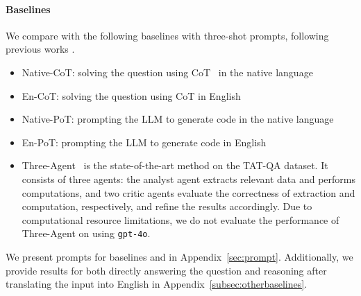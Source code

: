 \paragraph{Baselines}
We compare \ourmethod with the following baselines with three-shot prompts, following previous works \cite{shi2023MGSM,li-etal-2024-eliciting-Multilingual-code}.
\begin{itemize}
    \item Native-CoT: solving the question using CoT~\cite{wei2022chain-of-thought} in the native language
    \item En-CoT: solving the question using CoT in English
    \item Native-PoT: prompting the LLM to generate code in the native language \cite{pal,pot}
    \item En-PoT: prompting the LLM to generate code in English 
    \item Three-Agent~\cite{fatemi2024three-agent} is the state-of-the-art method on the TAT-QA dataset. It consists of three agents: the analyst agent extracts relevant data and performs computations, and two critic agents evaluate the correctness of extraction and computation, respectively, and refine the results accordingly. 
    Due to computational resource limitations, we do not evaluate the performance of Three-Agent on \ourdataset using \texttt{gpt-4o}.
\end{itemize}
We present prompts for baselines and \ourmethod in Appendix~\ref{sec:prompt}.
Additionally, we provide results for both directly answering the question and reasoning after translating the input into English in Appendix~\ref{subsec:otherbaselines}.



